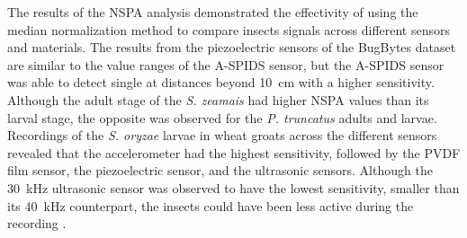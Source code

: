 \documentclass[../Vibro-Acoustic Signatures and Detection Algorithms for Stored Product Insects.tex]{subfiles}
\begin{document}
The results of the NSPA analysis demonstrated the effectivity of using the median normalization method to compare insects signals across different sensors and materials. The results from the piezoelectric sensors of the BugBytes dataset are similar to the value ranges of the A-SPIDS sensor, but the A-SPIDS sensor was able to detect single at distances beyond \SI{10}{\centi\meter} with a higher sensitivity. Although the adult stage of the \textit{S. zeamais} had higher NSPA values than its larval stage, the opposite was observed for the \textit{P. truncatus} adults and larvae. Recordings of the \textit{S. oryzae} larvae in wheat groats across the different sensors revealed that the accelerometer had the highest sensitivity, followed by the PVDF film sensor, the piezoelectric sensor, and the ultrasonic sensors. Although the \SI{30}{\kilo\hertz} ultrasonic sensor was observed to have the lowest sensitivity, smaller than its \SI{40}{\kilo\hertz} counterpart, the insects could have been less active during the recording \cite{mankinAcousticIndicatorsTargeted2010}. 

\newpage
\end{document}
